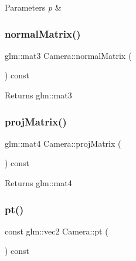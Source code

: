\begin{DoxyParams}{Parameters}
{\em p} & \\
\hline
\end{DoxyParams}
\mbox{\label{class_camera_a2032bd7b990ca809759feabf2e54c612}} 
\subsubsection{\texorpdfstring{normal\+Matrix()}{normalMatrix()}}
{\footnotesize\ttfamily glm\+::mat3 Camera\+::normal\+Matrix (\begin{DoxyParamCaption}{ }\end{DoxyParamCaption}) const\hspace{0.3cm}{\ttfamily [inline]}}

\begin{DoxyReturn}{Returns}
glm\+::mat3 
\end{DoxyReturn}
\mbox{\label{class_camera_a30d3392172776022c53909e8b846995a}} 
\subsubsection{\texorpdfstring{proj\+Matrix()}{projMatrix()}}
{\footnotesize\ttfamily glm\+::mat4 Camera\+::proj\+Matrix (\begin{DoxyParamCaption}{ }\end{DoxyParamCaption}) const\hspace{0.3cm}{\ttfamily [inline]}}

\begin{DoxyReturn}{Returns}
glm\+::mat4 
\end{DoxyReturn}
\mbox{\label{class_camera_ae8cd001188c4b4381cd78a30f2669151}} 
\subsubsection{\texorpdfstring{pt()}{pt()}}
{\footnotesize\ttfamily const glm\+::vec2 Camera\+::pt (\begin{DoxyParamCaption}{ }\end{DoxyParamCaption}) const\hspace{0.3cm}{\ttfamily [inline]}}

